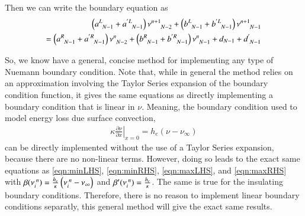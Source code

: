 \documentclass[letterpaper,12pt]{article}
\begin{document}
Then we can write the boundary equation as
\begin{align}
  \left( a\indices{^L_{N-1}} + a\indices{^{'L}_{N-1}} \right) \nu\indices{^{n+1}_{N-2}}
+ \left( b\indices{^L_{N-1}} + b\indices{^{'L}_{N-1}} \right) \nu\indices{^{n+1}_{N-1}} \nonumber \\
=
  \left( a\indices{^R_{N-1}} + a\indices{^{'R}_{N-1}} \right) \nu\indices{^{n  }_{N-2}}
+ \left( b\indices{^R_{N-1}} + b\indices{^{'R}_{N-1}} \right) \nu\indices{^{n  }_{N-1}}
+ d_{N-1} + d\indices{^'_{N-1}}
\end{align}

So, we know have a general, concise method for implementing any type of Nuemann boundary condition. Note that, while in general the
method relies on an approximation involving the Taylor Series expansion of the boundary condition function, it gives the same
equations as directly implementing a boundary condition that is linear in $\nu$. Meaning, the boundary condition used to model energy loss
due surface convection,
\begin{align}
  \kappa \left.\frac{\partial \nu}{\partial x}\right|_{x=0} = h_e \left(\nu - \nu_{\infty}\right)
\end{align}
can be directly implemented without the use of a Taylor Series expansion, because there are no non-linear terms. However, doing
so leads to the exact same equations as \ref{eqn:minLHS}, \ref{eqn:minRHS}, \ref{eqn:maxLHS}, and \ref{eqn:maxRHS} with
$\beta(\nu\indices{_{i}^n}) = \frac{h_e}{\kappa} \left(\nu\indices{_i^n} - \nu_{\infty}\right)$ and 
$\beta'(\nu\indices{_{i}^n}) = \frac{h_e}{\kappa}$. The same is true for the insulating boundary conditions.
Therefore, there is no reason to implement linear boundary conditions separatly, this general method will give the exact same
results.
\end{document}
